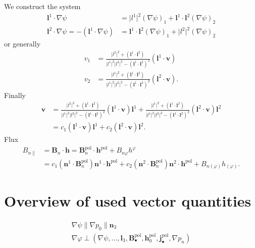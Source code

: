 \documentclass[a4paper, 10pt, english]{article}
\let\temp\vartheta
\let\vartheta\theta
\let\theta\temp
\let\temp\varphi
\let\varphi\phi
\let\phi\temp
\let\vec\symbf
\newcommand*\pol{\ensuremath{\textrm{pol}}}  %
\begin{document}
We construct the system
\begin{align*}
  \vec{l}^{1} \cdot \nabla \psi &= \lvert l^{1} \rvert^{2} (\nabla \psi)_{1} + \vec{l}^{1} \cdot \vec{l}^{2} (\nabla \psi)_{2} \\
  \vec{l}^{2} \cdot \nabla \psi = -(\vec{l}^{1} \cdot \nabla \psi) &= \vec{l}^{1} \cdot \vec{l}^{2} (\nabla \psi)_{1} + \lvert l^{2} \rvert^{2} (\nabla \psi)_{2}
\end{align*}
or generally
\begin{align*}
  v_{1} &= \frac{\lvert l^{2} \rvert^{2} + (\vec{l}^{1} \cdot \vec{l}^{2})}{\lvert l^{1} \rvert^{2} \lvert l^{2} \rvert^{2} - (\vec{l}^{1} \cdot \vec{l}^{2})^{2}} (\vec{l}^{1} \cdot \vec{v}) \\
  v_{2} &= \frac{\lvert l^{1} \rvert^{2} + (\vec{l}^{1} \cdot \vec{l}^{2})}{\lvert l^{1} \rvert^{2} \lvert l^{2} \rvert^{2} - (\vec{l}^{1} \cdot \vec{l}^{2})^{2}} (\vec{l}^{2} \cdot \vec{v}).
\end{align*}
Finally
\begin{align}
  \vec{v} &= \frac{\lvert l^{2} \rvert^{2} + (\vec{l}^{1} \cdot \vec{l}^{2})}{\lvert l^{1} \rvert^{2} \lvert l^{2} \rvert^{2} - (\vec{l}^{1} \cdot \vec{l}^{2})^{2}}(\vec{l}^{1} \cdot \vec{v}) \vec{l}^{1} + \frac{\lvert l^{1} \rvert^{2} + (\vec{l}^{1} \cdot \vec{l}^{2})}{\lvert l^{1} \rvert^{2} \lvert l^{2} \rvert^{2} - (\vec{l}^{1} \cdot \vec{l}^{2})^{2}}(\vec{l}^{2} \cdot \vec{v}) \vec{l}^{2} \\
  &= c_{1} (\vec{l}^{1} \cdot \vec{v}) \vec{l}^{1} + c_{2} (\vec{l}^{2} \cdot \vec{v}) \vec{l}^{2}.
\end{align}
Flux
\begin{align}
  B_{n \parallel} &= \vec{B}_{n} \cdot \vec{h} = \vec{B}_{n}^{\pol} \cdot \vec{h}^{\pol} + B_{n \phi} h^{\phi} \nonumber \\
  &= c_{1} (\vec{n}^{1} \cdot \vec{B}_{n}^{\pol}) \vec{n}^{1} \cdot \vec{h}^{\pol} + c_{2} (\vec{n}^{2} \cdot \vec{B}_{n}^{\pol}) \vec{n}^{2} \cdot \vec{h}^{\pol} + B_{n (\phi)} h_{(\phi)}.
\end{align}

\appendix
\section{Overview of used vector quantities}
\begin{gather*}
  \nabla \psi \parallel \nabla p_0 \parallel \vec{n}_3 \\
  \nabla \phi \perp \left( \nabla \psi, \dotsc, \vec{l}_3, \vec{B}_{\bullet}^{\pol}, \vec{h}_{0}^{\pol}, \vec{j}_{\bullet}^{\pol}, \nabla p_n \right)
\end{gather*}
\end{document}
